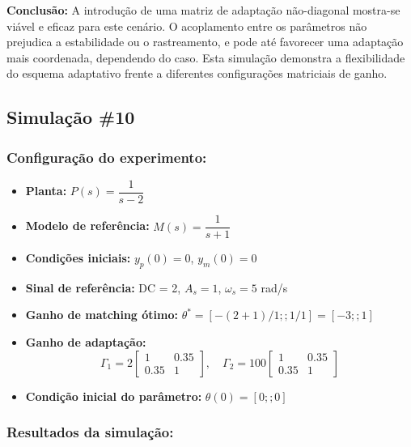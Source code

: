 \documentclass[10pt]{article}
\begin{document}
\textbf{Conclusão:} A introdução de uma matriz de adaptação não-diagonal mostra-se viável e eficaz para este cenário. O acoplamento entre os parâmetros não prejudica a estabilidade ou o rastreamento, e pode até favorecer uma adaptação mais coordenada, dependendo do caso. Esta simulação demonstra a flexibilidade do esquema adaptativo frente a diferentes configurações matriciais de ganho.

\newpage

\subsection{Simulação \#10}
\subsubsection{Configuração do experimento:}
\begin{itemize}
\item \textbf{Planta:} $P(s) = \dfrac{1}{s - 2}$
\item \textbf{Modelo de referência:} $M(s) = \dfrac{1}{s + 1}$
\item \textbf{Condições iniciais:} $y_p(0)=0$, $y_m(0)=0$
\item \textbf{Sinal de referência:} DC = 2, $A_s=1$, $\omega_s=5$ rad/s
\item \textbf{Ganho de matching ótimo:} $\theta^* = [-(2+1)/1;;1/1] = [-3;;1]$
\item \textbf{Ganho de adaptação:} 
\[
\Gamma_1 = 2 \begin{bmatrix} 1 & 0.35 \\ 0.35 & 1 \end{bmatrix}, \quad
\Gamma_2 = 100 \begin{bmatrix} 1 & 0.35 \\ 0.35 & 1 \end{bmatrix}
\]
\item \textbf{Condição inicial do parâmetro:} $\theta(0) = [0;;0]$
\end{itemize}

\subsubsection{Resultados da simulação:}
\end{document}
